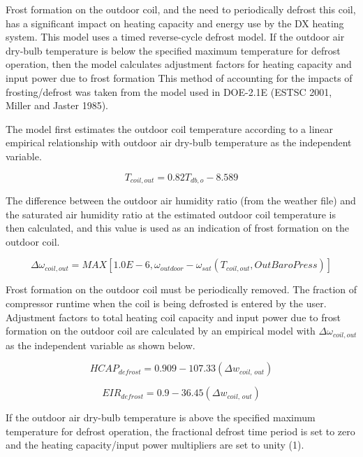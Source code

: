 Frost formation on the outdoor coil, and the need to periodically defrost this coil, has a significant impact on heating capacity and energy use by the DX heating system. This model uses a timed reverse-cycle defrost model. If the outdoor air dry-bulb temperature is below the specified maximum temperature for defrost operation, then the model calculates adjustment factors for heating capacity and input power due to frost formation This method of accounting for the impacts of frosting/defrost was taken from the model used in DOE-2.1E (ESTSC 2001, Miller and Jaster 1985).

The model first estimates the outdoor coil temperature according to a linear empirical relationship with outdoor air dry-bulb temperature as the independent variable.

\begin{equation}
  T_{coil,out} = 0.82 T_{db,o} - 8.589
\end{equation}

The difference between the outdoor air humidity ratio (from the weather file) and the saturated air humidity ratio at the estimated outdoor coil temperature is then calculated, and this value is used as an indication of frost formation on the outdoor coil.

\begin{equation}
  \Delta \omega_{coil,out} = MAX \left[ 1.0E - 6, \omega_{outdoor} - \omega_{sat} \left( T_{coil,out},OutBaroPress \right) \right]
\end{equation}

Frost formation on the outdoor coil must be periodically removed. The fraction of compressor runtime when the coil is being defrosted is entered by the user. Adjustment factors to total heating coil capacity and input power due to frost formation on the outdoor coil are calculated by an empirical model with \(\Delta \omega_{coil,out}\) as the independent variable as shown below.

\begin{equation}
  HCAP_{defrost} = 0.909 - 107.33 \left( \Delta w_{coil,\,out} \right)
\end{equation}

\begin{equation}
  EIR_{defrost} = 0.9 - 36.45 \left( \Delta w_{coil,\,out} \right)
\end{equation}

If the outdoor air dry-bulb temperature is above the specified maximum temperature for defrost operation, the fractional defrost time period is set to zero and the heating capacity/input power multipliers are set to unity (1).

